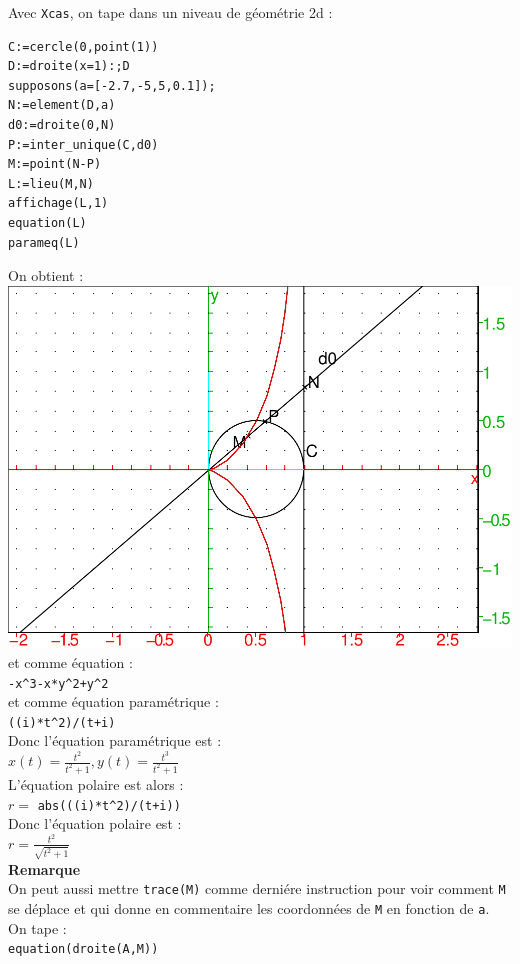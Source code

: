 \documentclass[a4paper,11pt]{book}
\begin{document}
Avec {\tt Xcas}, on tape dans un niveau de g\'eom\'etrie 2d :\\
\begin{verbatim}
C:=cercle(0,point(1))
D:=droite(x=1):;D
supposons(a=[-2.7,-5,5,0.1]);
N:=element(D,a)
d0:=droite(0,N)
P:=inter_unique(C,d0)
M:=point(N-P)
L:=lieu(M,N)
affichage(L,1)
equation(L)
parameq(L)
\end{verbatim}
On obtient :
\includegraphics[width=\textwidth]{cissoide}\\
et comme \'equation :\\
{\tt -x\verb|^|3-x*y\verb|^|2+y\verb|^|2}\\
et comme \'equation param\'etrique :\\
{\tt ((i)*t\verb|^|2)/(t+i)}\\
Donc l'\'equation param\'etrique est :\\
$\displaystyle x(t)=\frac{t^2}{t^2+1},y(t)=\frac{t^3}{t^2+1}$\\
L'\'equation polaire est alors :\\
$r=$ {\tt abs(((i)*t\verb|^|2)/(t+i))}\\
Donc l'\'equation polaire est :\\
$\displaystyle r=\frac{t^2}{\sqrt{t^2+1}}$\\
{\bf Remarque}\\
On peut aussi mettre {\tt trace(M)} comme derni\'ere instruction pour voir 
comment {\tt M} se d\'eplace et qui donne en commentaire les coordonn\'ees de 
{\tt M} en fonction de {\tt a}. \\
On tape :\\
{\tt equation(droite(A,M))}\\
\end{document}
